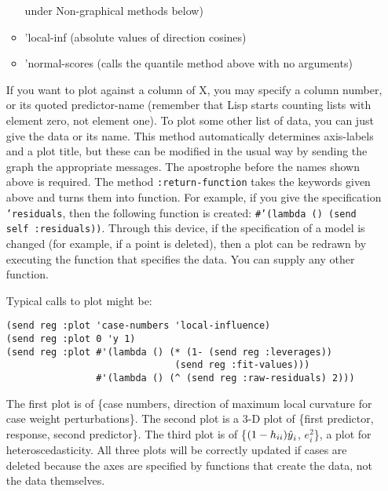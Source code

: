 \begin{itemize}
\begin{itemize}
under Non-graphical methods below)
	\item 'local-inf (absolute values of direction cosines)
	\item 'normal-scores (calls the quantile method above with no arguments)
	\end{itemize}
If you want to plot against a column of X, you may specify a column number, 
or its quoted predictor-name (remember that Lisp starts counting lists with
element zero, not element one).  To plot some other list of data, you can 
just give the data or its name.  This method automatically determines 
axis-labels and a plot title, but these can be modified in the usual way by
sending the graph the appropriate messages.  The apostrophe 
before the names shown above is required.  The method {\tt :return-function}
takes the keywords given above and turns them into function.  
For example, if you give the specification {\tt 'residuals}, then the 
following function is created:  {\tt \#'(lambda () (send self :residuals))}.  
Through this device, if the specification of a model is changed 
(for example, if a point is deleted), then a plot can be redrawn by 
executing the function that specifies the data.  You can supply any 
other function.  

Typical calls to plot might be:
\begin{verbatim}
(send reg :plot 'case-numbers 'local-influence) 
(send reg :plot 0 'y 1) 
(send reg :plot #'(lambda () (* (1- (send reg :leverages)) 
                              (send reg :fit-values))) 
                #'(lambda () (^ (send reg :raw-residuals) 2)))
\end{verbatim}
The first plot is of \{case numbers, direction of maximum local curvature for
case weight perturbations\}.  The second plot is a 3-D plot of \{first
predictor, response, second predictor\}.  The third plot is of
\{$(1-h_{ii})\mbox{$\hat{y}$}_i$, $e_i^2$\}, a plot for heteroscedasticity.  All three
plots will be correctly updated if cases are deleted because the axes are
specified by functions that create the data, not the data themselves.  


\end{itemize}
